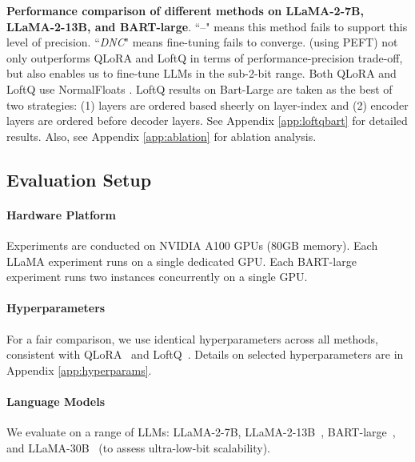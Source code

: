 \begin{table*}[ht]
    \caption{\textbf{Performance comparison of different methods on LLaMA-2-7B, LLaMA-2-13B, and BART-large}. ``--" means this method fails to support this level of precision. ``\textit{DNC}" means fine-tuning fails to converge. \FWName (using PEFT) not only outperforms QLoRA and LoftQ in terms of performance-precision trade-off, but also enables us to fine-tune LLMs in the sub-2-bit range. Both QLoRA and LoftQ use NormalFloats \cite{dettmers2024qlora}. LoftQ results on Bart-Large are taken as the best of two strategies: (1) layers are ordered based sheerly on layer-index and (2) encoder layers are ordered before decoder layers. See Appendix \ref{app:loftqbart} for detailed results. Also, see Appendix \ref{app:ablation} for ablation analysis.}
    \vspace{-10pt}
    \label{tab:performance_comparison}
\end{table*}





\subsection{Evaluation Setup}

\paragraph{Hardware Platform} 
Experiments are conducted on NVIDIA A100 GPUs (80GB memory). 
Each LLaMA experiment runs on a single dedicated GPU.
Each BART-large experiment runs two instances concurrently on a single GPU.

\paragraph{Hyperparameters} 
For a fair comparison, we use identical hyperparameters across all methods, consistent with QLoRA~\cite{dettmers2024qlora} and LoftQ~\cite{li2023loftq}. Details on selected hyperparameters are in Appendix \ref{app:hyperparams}.

\paragraph{Language Models} 
We evaluate \FWName on a range of LLMs: LLaMA-2-7B, LLaMA-2-13B~\cite{touvron2023llama2}, BART-large~\cite{lewis2019bart}, and LLaMA-30B~\cite{touvron2023llama} (to assess ultra-low-bit scalability).

